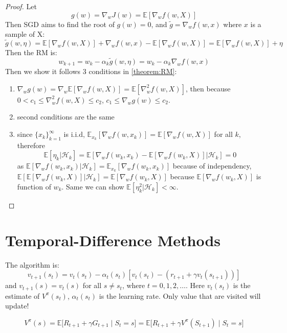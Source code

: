 \documentclass[10pt]{elegantbook}
\begin{document}
\begin{proof}
    Let 
    \[ g(w) = \nabla_w J(w) = \mathbb E[ \nabla_w f(w, X) ] \]
    Then SGD aims to find the root of $g(w) = 0$, and $\tilde{g} = \nabla_w f(w, x)$ where $x$ is a sample of X:
    \[ \tilde{g}(w, \eta) = \mathbb E[ \nabla_w f(w, X) ] + \nabla_w f(w, x) - \mathbb E[ \nabla_w f(w, X) ] = \mathbb E[ \nabla_w f(w, X) ] + \eta \]
    Then the RM is:
    \[ w_{k+1} = w_k - \alpha_k \tilde{g}(w, \eta) = w_k - \alpha_k \nabla_w f(w, x) \]
    Then we show it follows 3 conditions in \ref{theorem:RM}:
    \begin{enumerate}
        \item $\nabla_w g(w) = \nabla_w \mathbb E[ \nabla_w f(w, X) ] = \mathbb E[ \nabla^2_w f(w, X) ] $, then because $0 < c_1 \leq \nabla_w^2 f(w, X) \leq c_2$,
    $c_1 \leq \nabla_w g(w) \leq c_2$.
        \item second conditions are the same
        \item since $\{ x_k \}_{k=1}^{\infty}$ is i.i.d, $ \mathbb E_{x_k}[ \nabla_w f(w, x_k) ] = \mathbb E[ \nabla_w f(w, X) ]$ for all $k$, therefore
        \[ \mathbb{E}[\eta_k|\mathcal{H}_k] = \mathbb{E}[\nabla_wf(w_k,x_k)-\mathbb{E}[\nabla_wf(w_k,X)]|\mathcal{H}_k] = 0 \]
        as $\mathbb{E}[\nabla_wf(w_k,x_k) | \mathcal{H}_k] = \mathbb E_{x_k}[ \nabla_w f(w_k, x_k)]$ because of independency, 
        $\mathbb{E}[\mathbb{E}[\nabla_wf(w_k,X)]|\mathcal{H}_k] = \mathbb{E}[\nabla_wf(w_k,X)]$ because $\mathbb{E}[\nabla_wf(w_k,X)]$ is function of $w_k$.
        Same we can show $\mathbb{E}[\eta^2_k|\mathcal{H}_k] < \infty$.
    \end{enumerate}
\end{proof}


\section{Temporal-Difference Methods}
The algorithm is:
\begin{equation} \label{eq:TD}
    v_{t+1}(s_t) = v_t(s_t) - \alpha_t(s_t) [v_t(s_t) - (r_{t+1} + \gamma v_t(s_{t+1}))]
\end{equation}
and $v_{t+1}(s) = v_t(s)$ for all $s \neq s_t$, where $t = 0, 1, 2, \ldots$. Here $v_t(s_t)$ is the estimate of $V^{\pi}(s_t)$, $\alpha_t(s_t)$ is the 
learning rate. Only value that are visited will update!

\[ V^{\pi}(s) = \mathbb E \big [ R_{t+1} + \gamma G_{t+1} \mid S_t = s \big ] = \mathbb E \big [ R_{t+1} + \gamma V^{\pi}(S_{t+1}) \mid S_t = s \big ] \]
\end{document}
